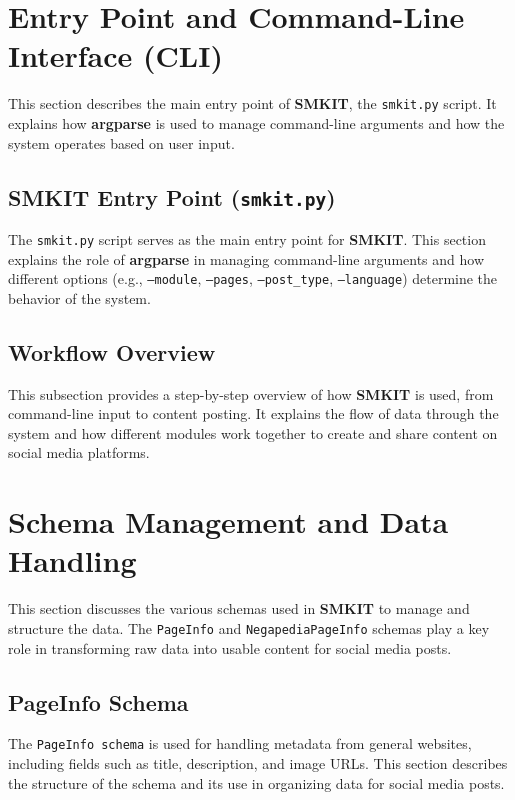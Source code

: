 \section{Entry Point and Command-Line Interface (CLI)}
\label{sec:entry_point_and_command_line_interface_cli}
This section describes the main entry point of \textbf{SMKIT}, the \texttt{smkit.py} script. It explains how \textbf{argparse} is used to manage command-line arguments and how the system operates based on user input.

\subsection{SMKIT Entry Point (\texttt{smkit.py})}
\label{subsec:smkit_entry_point_smkit_py}
The \texttt{smkit.py} script serves as the main entry point for \textbf{SMKIT}. This section explains the role of \textbf{argparse} in managing command-line arguments and how different options (e.g., \texttt{--module}, \texttt{--pages}, \texttt{--post\_type}, \texttt{--language}) determine the behavior of the system.

\subsection{Workflow Overview}
\label{subsec:workflow_overview}
This subsection provides a step-by-step overview of how \textbf{SMKIT} is used, from command-line input to content posting. It explains the flow of data through the system and how different modules work together to create and share content on social media platforms.

\section{Schema Management and Data Handling}
\label{sec:schema_management_and_data_handling}
This section discusses the various schemas used in \textbf{SMKIT} to manage and structure the data. The \texttt{PageInfo} and \texttt{NegapediaPageInfo} schemas play a key role in transforming raw data into usable content for social media posts.

\subsection{PageInfo Schema}
\label{subsec:pageinfo_schema}
The \texttt{PageInfo schema} is used for handling metadata from general websites, including fields such as title, description, and image URLs. This section describes the structure of the schema and its use in organizing data for social media posts.

